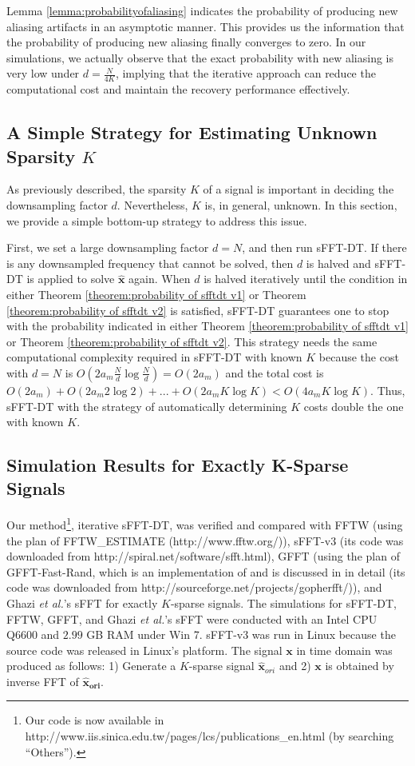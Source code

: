 \documentclass[journal,onecolumn,11pt]{IEEEtran}
\begin{document}
Lemma \ref{lemma:probabilityofaliasing} indicates the probability of producing new aliasing artifacts in an asymptotic manner.
This provides us the information that the probability of producing new aliasing finally converges to zero.
In our simulations, we actually observe that the exact probability with new aliasing is very low under $d=\frac{N}{4K}$, implying that the iterative approach can reduce the computational cost and maintain the recovery performance effectively.


\subsection{A Simple Strategy for Estimating Unknown Sparsity $K$ }\label{ssec:how to decide K}
As previously described, the sparsity $K$ of a signal is important in deciding the downsampling factor $d$.
Nevertheless, $K$ is, in general, unknown.
In this section, we provide a simple bottom-up strategy to address this issue.

First, we set a large downsampling factor $d=N$, and then run sFFT-DT.
If there is any downsampled frequency that cannot be solved, then $d$ is halved and sFFT-DT is applied to solve $\bm{\hat{x}}$ again.
When $d$ is halved iteratively until the condition in either Theorem \ref{theorem:probability of sfftdt v1} or Theorem \ref{theorem:probability of sfftdt v2} is satisfied, sFFT-DT guarantees one to stop with the probability indicated in either Theorem \ref{theorem:probability of sfftdt v1} or Theorem \ref{theorem:probability of sfftdt v2}.
This strategy needs the same computational complexity required in sFFT-DT with known $K$ because the cost with $d=N$ is $  O(2a_{m}\frac{N}{d}\log\frac{N}{d}) = O(2a_{m})$ and the total cost is $O(2a_{m})+O(2a_{m}2\log 2)+...+ O(2a_{m}K \log K) < O(4a_{m}K \log K)$.
Thus, sFFT-DT with the strategy of automatically determining $K$ costs double the one with known $K$.


\subsection{Simulation Results for Exactly K-Sparse Signals}\label{Sec: Experimental Results}
Our method\footnote{Our code is now available in http://www.iis.sinica.edu.tw/pages/lcs/publications\_en.html (by searching ``Others'').}, iterative  sFFT-DT, was verified and compared with FFTW (using the plan of FFTW\_ESTIMATE  (http://www.fftw.org/)), sFFT-v3 \cite{Haitham2012} (its code was downloaded from http://spiral.net/software/sfft.html), GFFT (using the plan of GFFT-Fast-Rand, which is an implementation of \cite{Iwen2010} and is discussed in \cite{Segal2012} in detail (its code was downloaded from http://sourceforge.net/projects/gopherfft/)), and Ghazi {\em et al.}'s sFFT \cite{Ghazi2013} for exactly $K$-sparse signals.
The simulations for sFFT-DT, FFTW, GFFT, and Ghazi {\em et al.}'s sFFT were conducted with an Intel CPU Q6600 and $2.99$ GB RAM under Win 7.
sFFT-v3 was run in Linux because the source code was released in Linux's platform.
The signal $\bm{x}$ in time domain was produced as follows:
1) Generate a $K$-sparse signal $\bm{\hat{x}}_{ori}$ and
2) $\bm{x}$ is obtained by inverse FFT of $\bm{\hat{x}_{ori}}$.
\end{document}
